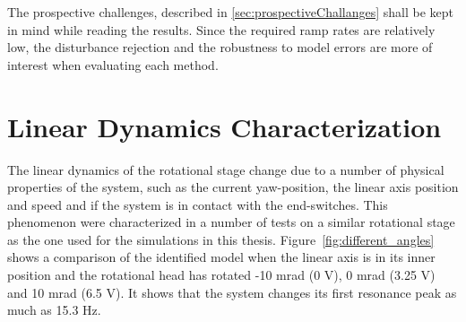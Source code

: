 The prospective challenges, described in \ref{sec:prospectiveChallanges} shall be kept in mind while reading the results. Since the required ramp rates are relatively low, the disturbance rejection and the robustness to model errors are more of interest when evaluating each method.

\section{Linear Dynamics Characterization}
The linear dynamics of the rotational stage change due to a number of physical properties of the system, such as the current yaw-position, the linear axis position and speed and if the system is in contact with the end-switches. This phenomenon were characterized in a number of tests on a similar rotational stage as the one used for the simulations in this thesis. Figure~\ref{fig:different_angles} shows a comparison of the identified model when the linear axis is in its inner position and the rotational head has rotated -10 mrad (0 V), 0 mrad (3.25 V) and 10 mrad (6.5 V). It shows that the system changes its first resonance peak as much as 15.3 Hz.

